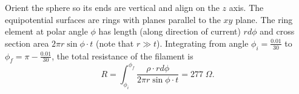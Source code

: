 \begin{solution}

Orient the sphere so its ends are vertical and align on the $z$ axis. The equipotential surfaces are rings with planes parallel to the $xy$ plane. The ring element at polar angle $\phi$ has length (along direction of current) $rd\phi$ and cross section area $2\pi r\sin\phi\cdot t$ (note that $r\gg t$). Integrating from angle $\phi_i=\frac{0.01}{30}$ to $\phi_f=\pi-\frac{0.01}{30}$, the total resistance of the filament is $$R=\int_{\phi_i}^{\phi_f}\frac{\rho\cdot rd\phi}{2\pi r\sin\phi\cdot t}=\boxed{277\;\Omega}.$$


\end{solution}
